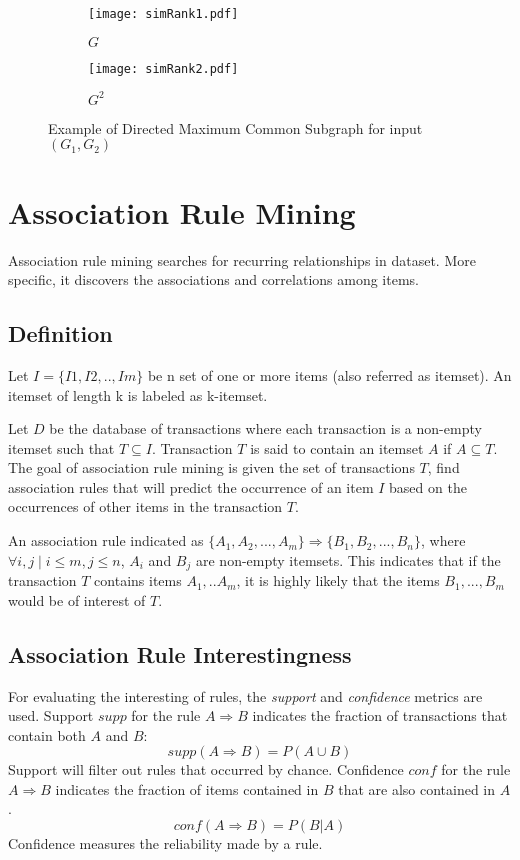 \begin{figure}[t]
	\begin{subfigure}{.35\textwidth}
		\centering
		\texttt{[image: simRank1.pdf]}
		\caption{$G$}
		\label{fig:mcs1}
	\end{subfigure}%
	\begin{subfigure}{.65\textwidth}
		\centering
		\texttt{[image: simRank2.pdf]}
		\caption{$G^{2}$}
		\label{fig:mcs2}
	\end{subfigure}
	\caption{Example of Directed Maximum Common Subgraph for input $(G_{1},G_{2})$ }
	\label{fig:simrank}
\end{figure}

\section{Association Rule Mining}
Association rule mining searches for recurring relationships in dataset.
More specific, it discovers the associations and correlations among items\cite{Han:2005:DMC:1076797}.
\subsection{Definition}
Let $I=\{I1,I2,..,Im\}$ be n set of one or more items (also referred as itemset).
An itemset of length k is labeled as k-itemset.

Let $D$ be the database of transactions where each transaction is a non-empty itemset such that $T \subseteq I$.
Transaction $T$ is said to contain an itemset $A$  if $A\subseteq T$.
The goal of association rule mining is given the set of transactions $T$, 
find association rules that will predict the occurrence of an item $I$ based on the occurrences of other items in the transaction $T$.

An association rule indicated as 
$\{A_{1},A_{2},...,A_{m}\}\Rightarrow \{B_{1},B_{2},...,B_{n}\}$, 
where $\forall i,j \mid i\leq m,j\leq n$, $A_{i}$ and $B_{j}$ are non-empty itemsets. This indicates that if the transaction $T$ contains items $A_{1},..A_{m}$, it is highly likely that the items $B_{1},...,B_{m}$ would be of interest of $T$.
\subsection{Association Rule Interestingness }
For evaluating the interesting of rules, the \emph{support} and \emph{confidence} metrics are used.
Support $supp$ for the rule $A\Rightarrow B$ indicates the fraction of transactions that contain both $A$ and $B$:
\begin{equation}
	supp(A\Rightarrow B) = P(A\cup B)
\end{equation}
Support will filter out rules that occurred by chance.
Confidence $conf$ for the rule $A\Rightarrow B$ indicates the fraction of items contained in $B$ that are also contained in $A$.
\begin{equation}
	conf(A \Rightarrow B) = P(B|A)
\end{equation}
Confidence measures the reliability made by a rule.

